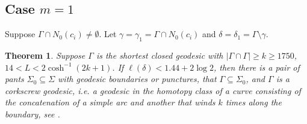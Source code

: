 \documentclass[11pt, a4paper]{article}
\newtheorem{thm}{Theorem}[section]
\theoremstyle{definition}
\theoremstyle{remark}
\newcommand{\abs}[1]{\left| #1 \right|}
\begin{document}
\subsection{Case $m=1$}

Suppose $\Gamma\cap N_0(c_i)\neq\emptyset$. Let $\gamma=\gamma_1=\Gamma\cap N_0(c_i)$ and $\delta=\delta_1=\Gamma\setminus\gamma$.

\begin{thm}
  Suppose $\Gamma$ is the shortest closed geodesic with $\abs{\Gamma\cap\Gamma}\geqslant k\geqslant1750$, $14<L<2\cosh^{-1}(2k+1)$. If $\ell(\delta)<1.44+2\log2$, then there is a pair of pants $\Sigma_0\subseteq\Sigma$ with geodesic boundaries or punctures, that $\Gamma\subseteq\Sigma_0$, and $\Gamma$ is a corkscrew geodesic, i.e. a geodesic in the homotopy class of a curve consisting of the concatenation of a simple arc and another that winds $k$ times along the boundary, see \cite{Y2801}.
\end{thm}
\end{document}
